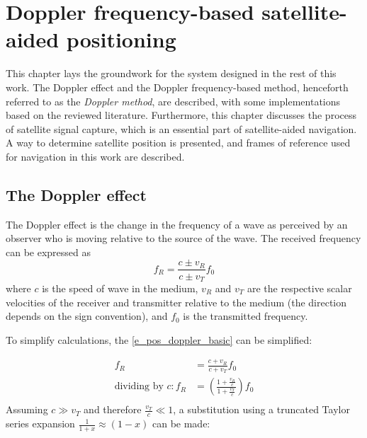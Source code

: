 \chapter{Doppler frequency-based satellite-aided positioning}
\label{s_pos}
This chapter lays the groundwork for the system designed in the rest of this work. The Doppler effect and the Doppler frequency-based method, henceforth referred to as the \textit{Doppler method}, are described, with some implementations based on the reviewed literature. Furthermore, this chapter discusses the process of satellite signal capture, which is an essential part of satellite-aided navigation. A way to determine satellite position is presented, and frames of reference used for navigation in this work are described. 



\section{The Doppler effect}
The Doppler effect is the change in the frequency of a wave as perceived by an observer who is moving relative to the source of the wave. The received frequency can be expressed as
\begin{equation}
    \label{e_pos_doppler_basic}
    f_R = \frac{c \pm v_R}{c \pm v_T} f_0
\end{equation}
 where $c$ is the speed of wave in the medium, $v_R$ and $v_T$ are the respective scalar velocities of the receiver and transmitter relative to the medium (the direction depends on the sign convention), and $f_0$ is the transmitted frequency. 

To simplify calculations, the \autoref{e_pos_doppler_basic} can be simplified:

\begin{align*}
    f_R &= \frac{c + v_R}{c + v_T} f_0 \\
    \text{dividing by } c: f_R & = (\frac{1 + \frac{v_R}{c}}{1 + \frac{v_T}{c}}) f_0 \\
\end{align*}
Assuming $c \gg v_T$ and therefore $\frac{v_T}{c} \ll 1$, a substitution using a truncated Taylor series expansion $\frac{1}{1 + x} \approx (1 - x)$ can be made:

